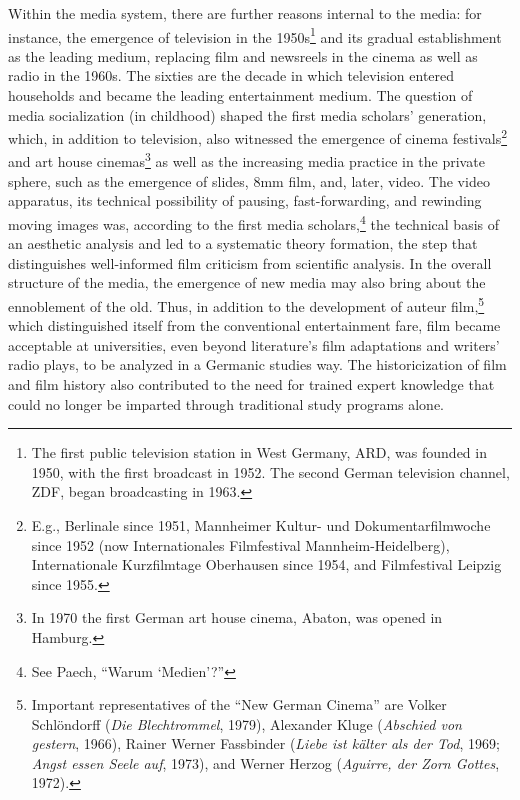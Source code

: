 \documentclass{tufte-handout}
\begin{document}
Within the media system, there are further reasons internal to the
media: for instance, the emergence of television in the 1950s\footnote{The
  first public television station in West Germany, ARD, was founded in
  1950, with the first broadcast in 1952. The second German television
  channel, ZDF, began broadcasting in 1963.} and its gradual
establishment as the leading medium, replacing film and newsreels in the
cinema as well as radio in the 1960s. The sixties are the decade in
which television entered households and became the leading entertainment
medium. The question of media socialization (in childhood) shaped the
first media scholars' generation, which, in addition to television, also
witnessed the emergence of cinema festivals\footnote{E.g., Berlinale
  since 1951, Mannheimer Kultur- und Dokumentarfilmwoche since 1952 (now
  Internationales Filmfestival Mannheim-Heidelberg), Internationale
  Kurzfilmtage Oberhausen since 1954, and Filmfestival Leipzig since
  1955.} and art house cinemas\footnote{In 1970 the first German art
  house cinema, Abaton, was opened in Hamburg.} as well as the
increasing media practice in the private sphere, such as the emergence
of slides, 8mm film, and, later, video. The video apparatus, its
technical possibility of pausing, fast-forwarding, and rewinding moving
images was, according to the first media scholars,\footnote{See Paech,
  ``Warum `Medien'?''} the technical basis of an aesthetic analysis and
led to a systematic theory formation, the step that distinguishes
well-informed film criticism from scientific analysis. In the overall
structure of the media, the emergence of new media may also bring about
the ennoblement of the old. Thus, in addition to the development of
auteur film,\footnote{Important representatives of the ``New German
  Cinema'' are Volker Schlöndorff (\emph{Die Blechtrommel}, 1979),
  Alexander Kluge (\emph{Abschied von gestern}, 1966), Rainer Werner
  Fassbinder (\emph{Liebe ist kälter als der Tod}, 1969; \emph{Angst
  essen Seele auf}, 1973), and Werner Herzog (\emph{Aguirre, der Zorn
  Gottes}, 1972).} which distinguished itself from the conventional
entertainment fare, film became acceptable at universities, even beyond
literature's film adaptations and writers' radio plays, to be analyzed
in a Germanic studies way. The historicization of film and film history
also contributed to the need for trained expert knowledge that could no
longer be imparted through traditional study programs alone.
\end{document}
